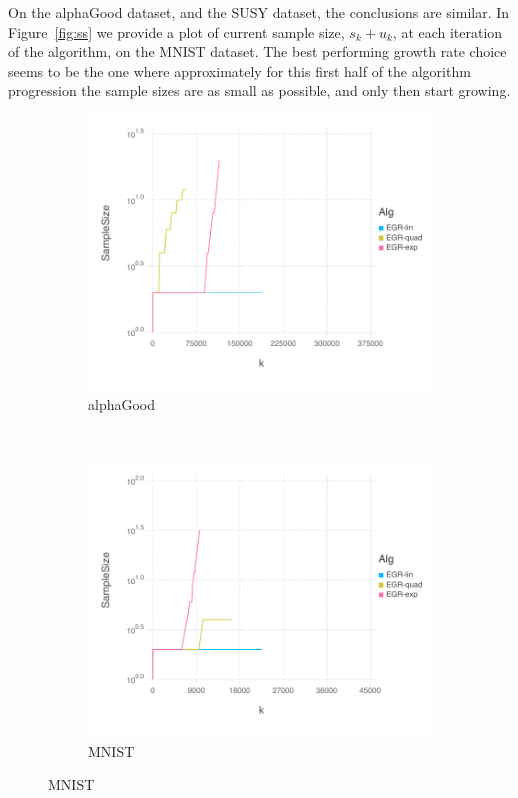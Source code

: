 \documentclass[11pt]{article}
\begin{document}
	     On the alphaGood dataset, and the SUSY dataset, the conclusions are similar. In Figure~\ref{fig:ss} we provide a plot of current sample size, $s_k+u_k$, at each iteration of the algorithm, on the MNIST dataset. The best performing growth rate choice seems to be the one where approximately for this first half of the algorithm progression the sample sizes are as small as possible, and only then start growing.
  
 
  \begin{figure}[H]
      \centering
      \begin{subfigure}[b]{0.45\textwidth}
          \includegraphics[width=\textwidth]{Figures/alphaGoodBLtrueSampleSizefFinal.pdf}
          \caption{alphaGood}
      \end{subfigure}
      ~ 
        \begin{subfigure}[b]{0.45\textwidth}
          \includegraphics[width=\textwidth]{Figures/MNISTBLtrueSampleSizefFinal.pdf}
            \caption{MNIST}
        \end{subfigure}
		

\end{figure}
\end{document}
